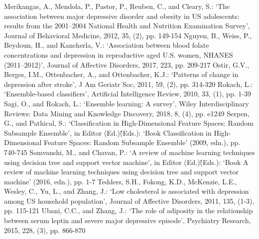\documentclass[runningheads]{llncs}
\begin{document}
\begin{thebibliography}{8}
Merikangas, A., Mendola, P., Pastor, P., Reuben, C., and Cleary, S.: ‘The association between major depressive disorder and obesity in US adolescents: results from the 2001–2004 National Health and Nutrition Examination Survey’, Journal of Behavioral Medicine, 2012, 35, (2), pp. 149-154
Nguyen, B., Weiss, P., Beydoun, H., and Kancherla, V.: ‘Association between blood folate concentrations and depression in reproductive aged U.S. women, NHANES (2011–2012)’, Journal of Affective Disorders, 2017, 223, pp. 209-217
Ostir, G.V., Berges, I.M., Ottenbacher, A., and Ottenbacher, K.J.: ‘Patterns of change in depression after stroke’, J Am Geriatr Soc, 2011, 59, (2), pp. 314-320
Rokach, L.: ‘Ensemble-based classifiers’, Artificial Intelligence Review, 2010, 33, (1), pp. 1-39
Sagi, O., and Rokach, L.: ‘Ensemble learning: A survey’, Wiley Interdisciplinary Reviews: Data Mining and Knowledge Discovery, 2018, 8, (4), pp. e1249
Serpen, G., and Pathical, S.: ‘Classification in High-Dimensional Feature Spaces: Random Subsample Ensemble’, in Editor (Ed.)\^(Eds.): ‘Book Classification in High-Dimensional Feature Spaces: Random Subsample Ensemble’ (2009, edn.), pp. 740-745
Somvanshi, M., and Chavan, P.: ‘A review of machine learning techniques using decision tree and support vector machine’, in Editor (Ed.)\^(Eds.): ‘Book A review of machine learning techniques using decision tree and support vector machine’ (2016, edn.), pp. 1-7
Tedders, S.H., Fokong, K.D., McKenzie, L.E., Wesley, C., Yu, L., and Zhang, J.: ‘Low cholesterol is associated with depression among US household population’, Journal of Affective Disorders, 2011, 135, (1-3), pp. 115-121
Ubani, C.C., and Zhang, J.: ‘The role of adiposity in the relationship between serum leptin and severe major depressive episode’, Psychiatry Research, 2015, 228, (3), pp. 866-870
%
%
%
\end{thebibliography}
\end{document}
